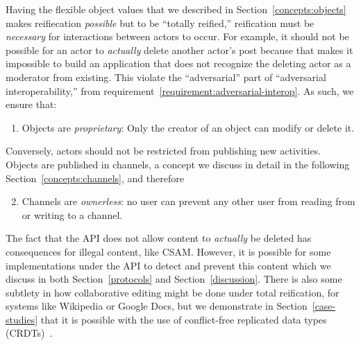 

Having the flexible object values that we described in Section~\ref{concepts:objects}
makes reifiecation \emph{possible} but to be ``totally reified,''
reification must be \emph{necessary} for interactions between
actors to occur.
For example, it should not be possible for an actor to \emph{actually}
delete another actor's post because that makes it impossible to build
an application that does not recognize the deleting actor as a moderator from existing.
This violate the ``adversarial'' part of ``adversarial interoperability,''
from requirement~\ref{requirement:adversarial-interop}.
As such, we ensure that:
\begin{enumerate}
\item
Objects are \emph{proprietary}: Only the creator of an object can modify or delete it.
\end{enumerate}
Conversely, actors should not be restricted from publishing new
activities.
Objects are published in channels, a concept we discuss in detail
in the following Section~\ref{concepts:channels}, and therefore
\begin{enumerate}
\setcounter{enumi}{1}
\item
Channels are \emph{ownerless}: no user can prevent any other user from reading from or writing to a channel.
\end{enumerate}

The fact that the API does not allow content to \emph{actually} be deleted
has consequences for illegal content, like CSAM.
However, it is possible for some implementations under the API to detect
and prevent this content which we discuss in both
Section~\ref{protocols} and Section~\ref{discussion}.
There is also some subtlety in how collaborative editing might be done under total reification,
for systems like Wikipedia or Google Docs,
but we demonstrate in Section~\ref{case-studies} that
it is possible with the use of conflict-free replicated data types (CRDTs)~\cite{crdts}.

